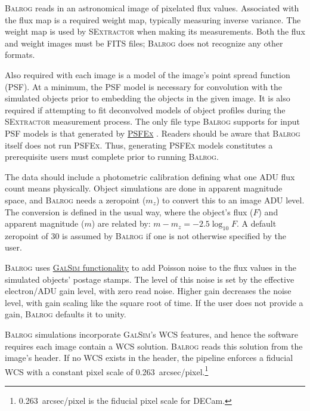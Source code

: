 \documentclass[11pt]{book}
\newcommand{\galsim}{\textsc{GalSim}}
\newcommand{\balrog}{\textsc{Balrog}}
\newcommand{\sex}{\textsc{SExtractor}}
\newcommand{\psfex}{\textsc{PSFEx}}
\begin{document}
\hypertarget{hyper:image}{}
\balrog{} reads in an astronomical image of pixelated flux values.
Associated with the flux map is a required weight map, typically measuring inverse variance.
The weight map is used by \sex{} when making its measurements.
Both the flux and weight images must be FITS files; %
\balrog{} does not recognize any other formats.

\hypertarget{hyper:psf}{}
Also required with each image is a model of the image's point spread function (PSF).
At a minimum, the PSF model is necessary for convolution with the simulated objects
prior to  embedding the objects in the given image.
It is also required if attempting to fit deconvolved models of object profiles during the \sex{} measurement process.
The only file type \balrog{} supports for input PSF models is that generated by 
\href{http://www.astromatic.net/software/psfex}{\psfex{}} \citep{psfex}.
Readers should be aware that \balrog{} itself does not run \psfex{}.
Thus, generating \psfex{} models constitutes a prerequisite users must complete prior to running \balrog{}.

\hypertarget{hyper:zeropoint}{}
The data should include a photometric calibration defining what one ADU flux count means physically. 
Object simulations are done in apparent magnitude space, 
and \balrog{} needs a zeropoint ($m_z$) to convert this to an image ADU level.
The conversion is defined in the usual way, where the object's flux ($F$) and apparent magnitude ($m$) are related by:
$m - m_ z = -2.5 \log_{10} F$.
A default zeropoint of 30 is assumed by \balrog{} if one is not otherwise specified by the user.

\hypertarget{hyper:gain}{}
\balrog{} uses \href{http://galsim-developers.github.io/GalSim/classgalsim\_1\_1\_c\_c\_d\_noise.html}{\galsim{} functionality} 
to add Poisson noise to the flux values in the simulated objects' postage stamps.
The level of this noise is set by the effective electron/ADU gain level, with zero read noise.
Higher gain decreases the noise level, with gain scaling like the square root of time.
If the user does not provide a gain, \balrog{} defaults it to unity.

\hypertarget{hyper:wcs}{}
\balrog{} simulations incorporate \galsim{}'s WCS features, and hence
the software requires each image contain a WCS solution. \balrog{} reads this solution from the image's header.
If no WCS exists in the header, the pipeline enforces a fiducial WCS with a constant pixel scale of 
0.263~arcsec/pixel.\footnote{0.263~arcsec/pixel is the fiducial pixel scale for DECam.}
\end{document}
